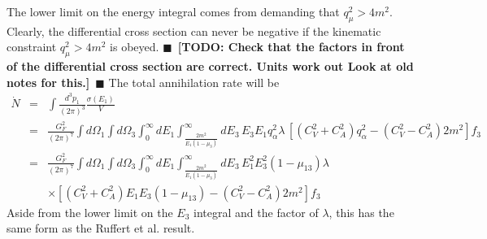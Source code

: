 \documentclass[12pt,letter]{article}
\newcommand{\todo}[1]{{$\blacksquare$~\textbf{\color{blue}[TODO: #1]}}~$\blacksquare$}
\begin{document}
The lower limit on the energy integral comes from demanding that $q_\mu^2>4m^2$.  Clearly, the differential cross section can never be negative if the kinematic constraint $q_\mu^2 > 4m^2$ is obeyed.    
\todo{Check that the factors in front of the differential cross section are correct.  Units work out Look at old notes for this.}
The total annihilation rate will be 
\begin{eqnarray*}
\dot N &=& \int \frac{d^3p_1}{(2\pi)^3} \frac{\sigma(E_1)}{V} \\
&=& \frac{G_F^2}{(2 \pi)^7}  
\int d\Omega_1 \int d\Omega_3 \int_0^\infty dE_1
\int_{\frac{2 m^2}{E_1 (1-\mu_3)}}^\infty dE_3 \, E_3 E_1
 q_\alpha^2 \lambda \, \left[(C_V^2+C_A^2) q_\alpha^2 
 - (C_V^2-C_A^2) 2 m^2 \right]f_3 \\
 &=& \frac{G_F^2}{(2 \pi)^7}  
\int d\Omega_1 \int d\Omega_3 \int_0^\infty dE_1
\int_{\frac{2 m^2}{E_1 (1-\mu_3)}}^\infty dE_3 \, E_1^2 E_3^2 (1-\mu_{13})
\lambda \, \\
&& \times \left[(C_V^2+C_A^2) E_1 E_3 (1-\mu_{13}) 
 - (C_V^2-C_A^2) 2 m^2 \right]f_3 
\end{eqnarray*}
Aside from the lower limit on the $E_3$ integral and the factor of $\lambda$, this has the same form as the Ruffert et al. result.  
\end{document}
